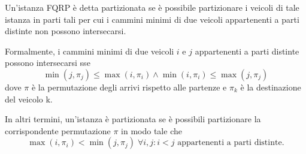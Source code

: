 \documentclass[../main.tex]{subfiles}
\begin{document}
\begin{definition}\label{def_part}
  Un'istanza FQRP è detta partizionata se è possibile partizionare i veicoli di tale istanza in parti tali per cui i cammini minimi di due veicoli appartenenti a parti distinte non possono intersecarsi.
\end{definition}
Formalmente, i cammini minimi di due veicoli $i$ e $j$ appartenenti a parti distinte possono intersecarsi sse
\[ \min(j, \pi_j) \leq \max(i, \pi_i) \wedge \min(i, \pi_i) \leq \max(j, \pi_j) \]
dove $\pi$ è la permutazione degli arrivi rispetto alle partenze e $\pi_k$ è la destinazione del veicolo k.

In altri termini, un'istanza è partizionata se è possibili partizionare la corrispondente permutazione $\pi$ in modo tale che
\begin{equation}
  \label{cond_part}
  \max(i, \pi_i) < \min(j, \pi_j)\;\forall i, j : i < j \mbox{ appartenenti a parti distinte}.
\end{equation}
\end{document}

